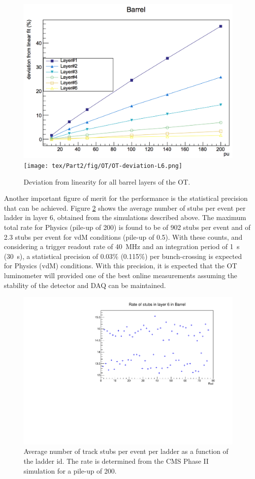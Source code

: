 \begin{figure}[h!]
\centering
\includegraphics[width=.48\linewidth]{tex/Part2/fig/OT/OT-deviation.png}
\texttt{[image: tex/Part2/fig/OT/OT-deviation-L6.png]}
\caption{
 Deviation from linearity for all barrel layers of the OT. 
}
\label{fig:OT_deviation}
\end{figure}

Another important figure of merit for the performance is the statistical precision that can be achieved. Figure \ref{fig:OT_rates} shows the average number of stubs per event per ladder in layer 6, obtained from the simulations described above. The maximum total rate for Physics (pile-up of 200) is found to be of 902 stubs per event and of 2.3 stubs per event for vdM conditions (pile-up of 0.5). With these counts, and considering a trigger readout rate of 40~MHz and an integration period of 1~s (30~s), a statistical precision of 0.03\% (0.115\%) per bunch-crossing is expected for Physics (vdM) conditions.
With this precision, it is expected that the OT luminometer will provided one of the best online measurements assuming the stability of the detector and DAQ can be maintained. 

\begin{figure}[h!]
\centering
\includegraphics[width=.6\linewidth]{tex/Part2/fig/OT/OT-Rates.pdf}
\caption{
  Average number of track stubs per event per ladder as a function of the ladder id.
  The rate is determined from the CMS Phase II simulation for a pile-up of 200. 
}
\label{fig:OT_rates}
\end{figure}

